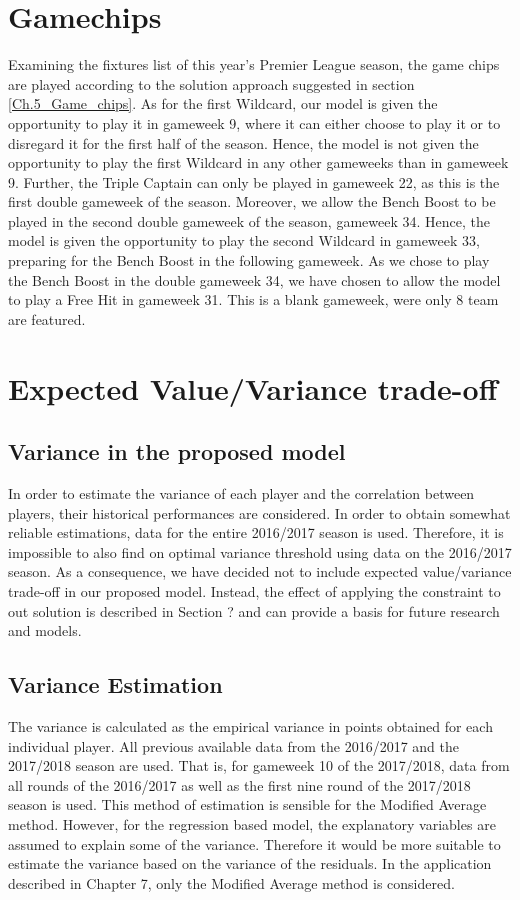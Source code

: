\section{Gamechips} \label{exp_setup_gamechips}
Examining the fixtures list of this year's Premier League season, the game chips are played according to the solution approach suggested in section \ref{Ch.5_Game_chips}. As for the first Wildcard, our model is given the opportunity to play it in gameweek 9, where it can either choose to play it or to disregard it for the first half of the season. Hence, the model is not given the opportunity to play the first Wildcard in any other gameweeks than in gameweek 9. Further, the Triple Captain can only be played in gameweek 22, as this is the first double gameweek of the season. Moreover, we allow the Bench Boost to be played in the second double gameweek of the season, gameweek 34. Hence, the model is given the opportunity to play the second Wildcard in gameweek 33, preparing for the Bench Boost in the following gameweek. As we chose to play the Bench Boost in the double gameweek 34, we have chosen to allow the model to play a Free Hit in gameweek 31. This is a blank gameweek, were only 8 team are featured.


\section{Expected Value/Variance trade-off}
\label{exp_setup_Value_Variance}

\subsection{Variance in the proposed model}

In order to estimate the variance of each player and the correlation between players, their historical performances are considered. In order to obtain somewhat reliable estimations, data for the entire 2016/2017 season is used. Therefore, it is impossible to also find on optimal variance threshold using data on the 2016/2017 season. As a consequence, we have decided not to include expected value/variance trade-off in our proposed model. Instead, the effect of applying the constraint to out solution is described in Section ? and can provide a basis for future research and models.

\subsection{Variance Estimation}
The variance is calculated as the empirical variance in points obtained for each individual player. All previous available data from the 2016/2017 and the 2017/2018 season are used. That is, for gameweek 10 of the 2017/2018, data from all rounds of the 2016/2017 as well as the first nine round of the 2017/2018 season is used. This method of estimation is sensible for the Modified Average method. However, for the regression based model, the explanatory variables are assumed to explain some of the variance. Therefore it would be more suitable to estimate the variance based on the variance of the residuals. In the application described in Chapter 7, only the Modified Average method is considered. \newpar

